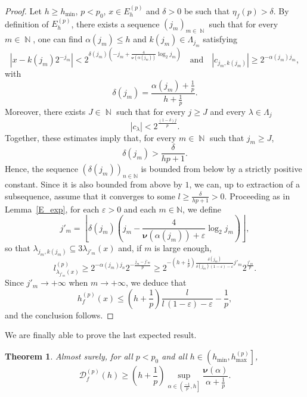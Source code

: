 \documentclass[a4paper,11pt,oneside]{article}
\DeclareMathOperator{\N}{\mathbb{N}}
\newcommand{\ocint}[1]{\left({#1}\right]}
\newcommand{\modu}[1]{\left\vert{#1}\right\vert}
\theoremstyle{definition}
\theoremstyle{plain}
\newtheorem{thm}[defi]{Theorem}
\begin{document}
\begin{proof}
Let $h\geq h_{\min}$, $p<p_0$, $x\in E_h^{(p)}$ and $\delta>0$ be such that $\eta_f(p)>\delta$. By definition of $E_h^{(p)}$, there exists a sequence $(j_m)_{m\in\N}$ such that for every $m\in\N$, one can find $\alpha(j_m)\leq h$ and $k(j_m)\in\Lambda_{j_m}$ satisfying 
\[
\modu{x-k(j_m)2^{-j_m}}<2^{\delta(j_m)\left(-j_m+\frac{4}{\bm{\nu}(\alpha(j_m))}\log_2j_m\right)}\quad\text{and}\quad \modu{c_{j_m,k(j_m)}}\geq 2^{-\alpha(j_m)j_m},
\]
with
\[
\delta(j_m)=\frac{\alpha(j_m)+\frac{1}{p}}{h+\frac{1}{p}}.
\]
Moreover, there exists $J\in\N$ such that for every $j\geq J$ and every $\lambda\in\Lambda_j$
\[
\modu{c_\lambda}<2^{\frac{(1-\delta)j}{p}}.
\]
Together, these estimates imply that, for every $m\in\N$ such that $j_m\geq J$,
\[
\delta(j_m)>\frac{\delta}{hp+1}.
\]
Hence, the sequence $(\delta(j_m))_{n \in \mathbb{N}}$ is bounded from below by a strictly positive constant. Since it is also bounded from above by $1$, we can, up to extraction of a subsequence, assume that it converges to some $l \geq \frac{\delta}{h p + 1} > 0$. Proceeding as in Lemma~\ref{E_exp}, for each $\varepsilon > 0$ and each $m \in \mathbb{N}$, we define
\[
j'_m=\left\lfloor\delta(j_m) \left(j_m-\frac{4}{\bm{\nu}(\alpha(j_m))+\varepsilon}\log_2j_m\right)\right\rfloor,
\]
so that
$\lambda_{j_m,k(j_m)}\subseteq 3\lambda_{j'_m}(x)$ and, if $m$ is large enough,
\[
l_{\lambda_{j'_m}(x)}^{(p)}\geq 2^{-\alpha(j_m) j_n}2^{-\frac{j_m-j'_m}{p}}\geq 2^{-\left(h+\frac{1}{p}\right)\frac{\delta(j_m)}{\delta(j_m)(1-\varepsilon)-\varepsilon}j'_m}2^{\frac{j'_m}{p}}.
\]
Since $j'_m\rightarrow+\infty$ when $m\rightarrow+\infty$, we deduce that
\[
h_f^{(p)}(x)\leq\left(h+\frac{1}{p}\right)\frac{l}{l\,(1-\varepsilon)-\varepsilon}-\frac{1}{p},
\]
and the conclusion follows.
\end{proof}

We are finally able to prove the last expected result.

\begin{thm}\label{inf_spectre}
Almost surely, for all $p<p_0$ and all $h\in\ocint{h_{\min},h_{\max}^{(p)}}$, 
\[
\mathscr{D}^{(p)}_f(h)\geq \left(h+\frac{1}{p}\right)\sup_{\alpha\in\ocint{\frac{-1}{p},h}}\frac{\bm{\nu}(\alpha)}{\alpha+\frac{1}{p}}.
\]
\end{thm}
\end{document}
